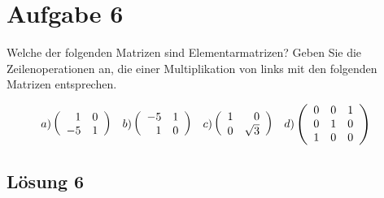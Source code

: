\documentclass[main.tex]{subfiles}
\begin{document}
\section{Aufgabe 6}
Welche der folgenden Matrizen sind Elementarmatrizen? Geben Sie die Zeilenoperationen an, 
die einer Multiplikation von links mit den folgenden Matrizen entsprechen.

\begin{align*}
    a) & 
    \eqmatrix{rr}{
         1 & 0 \\
        -5 & 1
    } &
    b) & 
    \eqmatrix{rr}{
        -5 & 1 \\
         1 & 0
    } &
    c) & 
    \eqmatrix{rr}{
         1 & 0 \\
         0 & \sqrt{3}
    } &
    d) & 
    \eqmatrix{ccc}{
        0 & 0 & 1 \\
        0 & 1 & 0 \\
        1 & 0 & 0
    }
\end{align*}

\subsection{Lösung 6}
\end{document}
